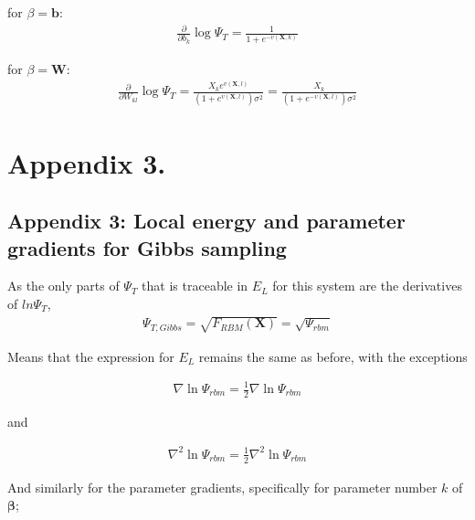 \documentclass[%
oneside,                 %
final,                   %
10pt]{article}
\begin{document}
\begin{appendices}
for $\beta=\bm b$:
\begin{equation}
\begin{aligned}
\frac{\partial}{\partial b_k} \log \Psi_T 
= 
  \frac{1}{1 + e^{-v(\bm X,k)}}
\end{aligned}
\label{eq:Appendix2_grad_b}
\end{equation}

for $\beta=\bm W$:
\begin{equation}
\begin{aligned}
\frac{\partial}{\partial W_{kl}} \log \Psi_T = 
  \frac{X_k e^{v(\bm X,l)} }{(1 + e^{v(\bm X,l)}) \sigma^2} =
  \frac{X_k} {(1 + e^{-v(\bm X,l)}) \sigma^2} 
\end{aligned}
\label{eq:Appendix2_grad_b}
\end{equation}


\section{Appendix 3.} \label{APP_3}
\subsection{Appendix 3: Local energy and parameter gradients for Gibbs sampling}
As the only parts of $\Psi_T$ that is traceable in $E_L$ for this system are the derivatives of $ln \Psi_T$, 
\begin{equation}
\begin{aligned}
\Psi_{T,Gibbs}=\sqrt{F_{RBM}(\bm X)}=\sqrt{\Psi_{rbm} }
\end{aligned}
\label{eq:wfgibs}
\end{equation}

Means that the expression for $E_L$ remains the same as before, with the exceptions

\begin{equation}
\begin{aligned}
\nabla \ln \Psi_{rbm} = \frac{1}{2} \nabla \ln \Psi_{rbm}
\end{aligned}
\end{equation}

and

\begin{equation}
\begin{aligned}
\nabla^2 \ln \Psi_{rbm} = \frac{1}{2} \nabla^2 \ln \Psi_{rbm}
\end{aligned}
\end{equation}

And similarly for the parameter gradients, specifically for parameter number $k$ of $\bm \beta$;


\end{appendices}
\end{document}

